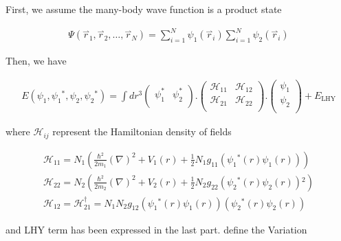 First, we assume the many-body wave function is a product state

\begin{equation}
\begin{split}
\Psi \left(\overset{\rightharpoonup }{r}_1,\overset{\rightharpoonup }{r}_2,\ldots  ,\overset{\rightharpoonup }{r}_N\right)=\sum _{i=1}^N \psi _1\left(\overset{\rightharpoonup
}{r}_i\right)\sum _{i=1}^N \psi _2\left(\overset{\rightharpoonup }{r}_i\right)
\end{split}
\end{equation}

Then, we have

\begin{equation}
\begin{split}
E\left(\psi _1,\psi _1{}^*,\psi _2,\psi _2{}^*\right)=\int dr^3\left(
\begin{array}{cc}
 \psi _1^* & \psi _2^* \\
\end{array}
\right).\left(
\begin{array}{cc}
 \mathcal{H}_{11} & \mathcal{H}_{12} \\
 \mathcal{H}_{21} & \mathcal{H}_{22} \\
\end{array}
\right).\left(
\begin{array}{c}
 \psi _1 \\
 \psi _2 \\
\end{array}
\right)+E_{\text{LHY}}
\end{split}
\end{equation}

where \(\mathcal{H}_{ij}\) represent the Hamiltonian density of fields

\begin{equation}
\begin{split}
\mathcal{H}_{11}=N_1\left(\frac{\hbar ^2}{2m_1}(\nabla )^2+V_1(r)+\frac{1}{2}N_1g_{11}\left(\psi _1{}^*(r)\psi _1(r)\right)\right)\\
\mathcal{H}_{22}=N_2\left(\frac{\hbar ^2}{2m_2}(\nabla )^2+V_2(r)+\frac{1}{2}N_2g_{22}\left(\psi _2{}^*(r)\psi _2(r)\right){}^2\right)\\
\mathcal{H}_{12}=\mathcal{H}_{21}^{\dagger }=N_1N_2g_{12}\left(\psi _1{}^*(r)\psi _1(r)\right)\left(\psi _2{}^*(r)\psi _2(r)\right)
\end{split}
\end{equation}

and LHY term has been expressed in the last part.
define the Variation

